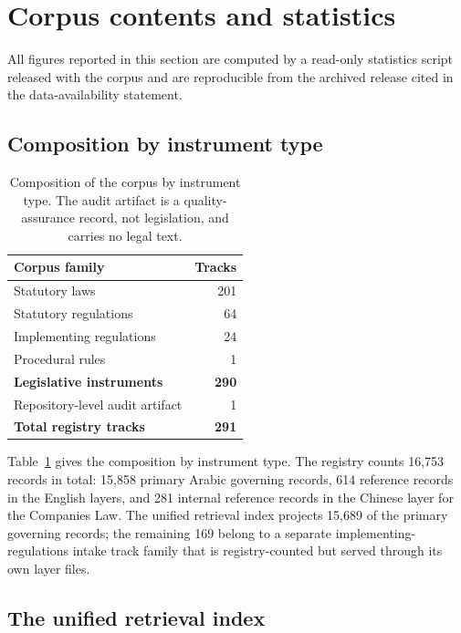 \documentclass[sn-basic]{sn-jnl}%
\begin{document}
\section{Corpus contents and statistics}
\label{sec:contents}

All figures reported in this section are computed by a read-only statistics
script released with the corpus and are reproducible from the archived
release cited in the data-availability statement.

\subsection{Composition by instrument type}

\begin{table}[t]
\centering
\small
\begin{tabular}{lr}
\toprule
\textbf{Corpus family} & \textbf{Tracks} \\
\midrule
Statutory laws & 201 \\
Statutory regulations & 64 \\
Implementing regulations & 24 \\
Procedural rules & 1 \\
\midrule
\textbf{Legislative instruments} & \textbf{290} \\
Repository-level audit artifact & 1 \\
\midrule
\textbf{Total registry tracks} & \textbf{291} \\
\bottomrule
\end{tabular}
\caption{Composition of the corpus by instrument type. The audit artifact
is a quality-assurance record, not legislation, and carries no legal text.}
\label{tab:families}
\end{table}

Table~\ref{tab:families} gives the composition by instrument type. The
registry counts 16{,}753 records in total: 15{,}858 primary Arabic governing
records, 614 reference records in the English layers, and 281 internal
reference records in the Chinese layer for the Companies Law. The unified
retrieval index projects 15{,}689 of the primary governing records; the
remaining 169 belong to a separate implementing-regulations intake track
family that is registry-counted but served through its own layer files.

\subsection{The unified retrieval index}
\end{document}
